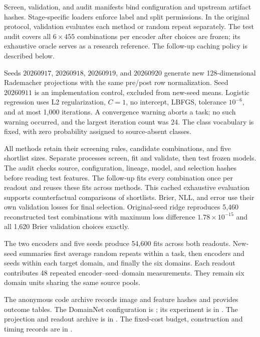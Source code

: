Screen, validation, and audit manifests bind configuration and upstream artifact hashes. Stage-specific loaders enforce label and split permissions. In the original protocol, validation evaluates each method or random repeat separately. The test audit covers all $6\times455$ combinations per encoder after choices are frozen; its exhaustive oracle serves as a research reference. The follow-up caching policy is described below.

Seeds $20260917$, $20260918$, $20260919$, and $20260920$ generate new 128-dimensional Rademacher projections with the same pre/post row normalization. Seed $20260911$ is an implementation control, excluded from new-seed means. Logistic regression uses L2 regularization, $C=1$, no intercept, LBFGS, tolerance $10^{-6}$, and at most 1,000 iterations. A convergence warning aborts a task; no such warning occurred, and the largest iteration count was 24. The class vocabulary is fixed, with zero probability assigned to source-absent classes.

All methods retain their screening rules, candidate combinations, and five shortlist sizes. Separate processes screen, fit and validate, then test frozen models. The audit checks source, configuration, lineage, model, and selection hashes before reading test features. The follow-up fits every combination once per readout and reuses these fits across methods. This cached exhaustive evaluation supports counterfactual comparisons of shortlists. Brier, NLL, and error use their own validation losses for final selection. Original-seed ridge reproduces 5,460 reconstructed test combinations with maximum loss difference $1.78\times10^{-15}$ and all 1,620 Brier validation choices exactly.

The two encoders and five seeds produce 54,600 fits across both readouts. New-seed summaries first average random repeats within a task, then encoders and seeds within each target domain, and finally the six domains. Each readout contributes 48 repeated encoder--seed--domain measurements. They remain six domain units sharing the same source pools.

The anonymous code archive records image and feature hashes and provides outcome tables. The DomainNet configuration is ; its experiment is in . The projection and readout archive is in . The fixed-cost budget, construction and timing records are in .

